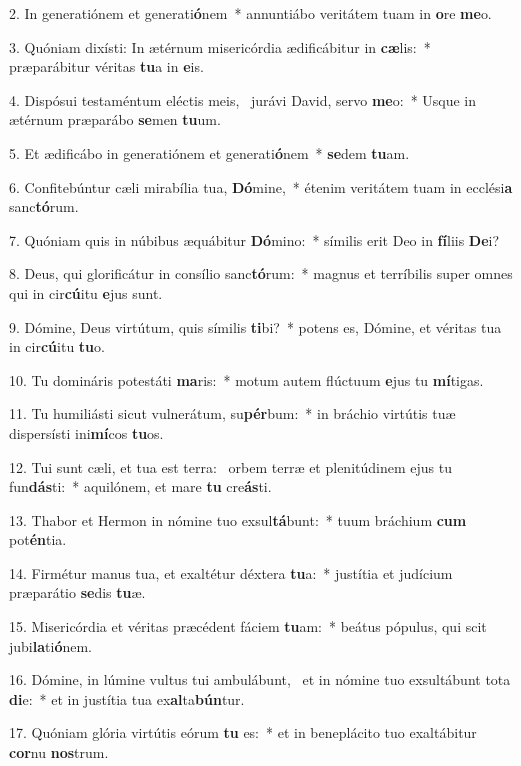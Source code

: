 2. In generatiónem et generati\textbf{ó}nem~*  annuntiábo veritátem tuam in \textbf{o}re \textbf{me}o.\

3. Quóniam dixísti: In ætérnum misericórdia ædificábitur in \textbf{cæ}lis:~*  præparábitur véritas \textbf{tu}a in \textbf{e}is.\

4. Dispósui testaméntum eléctis meis, \dag\  jurávi David, servo \textbf{me}o:~*  Usque in ætérnum præparábo \textbf{se}men \textbf{tu}um.\

5. Et ædificábo in generatiónem et generati\textbf{ó}nem~*  \textbf{se}dem \textbf{tu}am.\

6. Confitebúntur cæli mirabília tua, \textbf{Dó}mine,~*  étenim veritátem tuam in ecclési\textbf{a} sanc\textbf{tó}rum.\

7. Quóniam quis in núbibus æquábitur \textbf{Dó}mino:~*  símilis erit Deo in \textbf{fí}liis \textbf{De}i?\

8. Deus, qui glorificátur in consílio sanc\textbf{tó}rum:~*  magnus et terríbilis super omnes qui in cir\textbf{cú}itu \textbf{e}jus sunt.\

9. Dómine, Deus virtútum, quis símilis \textbf{ti}bi?~*  potens es, Dómine, et véritas tua in cir\textbf{cú}itu \textbf{tu}o.\

10. Tu domináris potestáti \textbf{ma}ris:~*  motum autem flúctuum \textbf{e}jus tu \textbf{mí}tigas.\

11. Tu humiliásti sicut vulnerátum, su\textbf{pér}bum:~*  in bráchio virtútis tuæ dispersísti ini\textbf{mí}cos \textbf{tu}os.\

12. Tui sunt cæli, et tua est terra: \dag\  orbem terræ et plenitúdinem ejus tu fun\textbf{dás}ti:~*  aquilónem, et mare \textbf{tu} cre\textbf{ás}ti.\

13. Thabor et Hermon in nómine tuo exsul\textbf{tá}bunt:~*  tuum bráchium \textbf{cum} pot\textbf{én}tia.\

14. Firmétur manus tua, et exaltétur déxtera \textbf{tu}a:~*  justítia et judícium præparátio \textbf{se}dis \textbf{tu}æ.\

15. Misericórdia et véritas præcédent fáciem \textbf{tu}am:~*  beátus pópulus, qui scit jubi\textbf{la}ti\textbf{ó}nem.\

16. Dómine, in lúmine vultus tui ambulábunt, \dag\  et in nómine tuo exsultábunt tota \textbf{di}e:~*  et in justítia tua ex\textbf{al}ta\textbf{bún}tur.\

17. Quóniam glória virtútis eórum \textbf{tu} es:~*  et in beneplácito tuo exaltábitur \textbf{cor}nu \textbf{nos}trum.\


